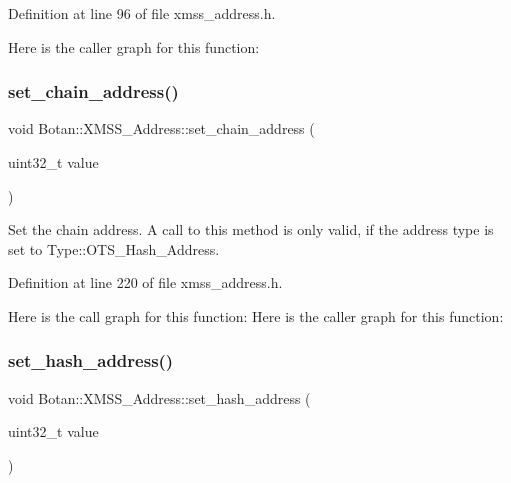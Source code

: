 Definition at line 96 of file xmss\+\_\+address.\+h.

Here is the caller graph for this function\+:
\mbox{\label{class_botan_1_1_x_m_s_s___address_a766e70130914b681020366d80c625fce}} 
\subsubsection{\texorpdfstring{set\+\_\+chain\+\_\+address()}{set\_chain\_address()}}
{\footnotesize\ttfamily void Botan\+::\+X\+M\+S\+S\+\_\+\+Address\+::set\+\_\+chain\+\_\+address (\begin{DoxyParamCaption}\item[{uint32\+\_\+t}]{value }\end{DoxyParamCaption})\hspace{0.3cm}{\ttfamily [inline]}}

Set the chain address. A call to this method is only valid, if the address type is set to Type\+::\+O\+T\+S\+\_\+\+Hash\+\_\+\+Address. 

Definition at line 220 of file xmss\+\_\+address.\+h.

Here is the call graph for this function\+:
Here is the caller graph for this function\+:
\mbox{\label{class_botan_1_1_x_m_s_s___address_a0a5d46d9a17f3a39808356d079b592fa}} 
\subsubsection{\texorpdfstring{set\+\_\+hash\+\_\+address()}{set\_hash\_address()}}
{\footnotesize\ttfamily void Botan\+::\+X\+M\+S\+S\+\_\+\+Address\+::set\+\_\+hash\+\_\+address (\begin{DoxyParamCaption}\item[{uint32\+\_\+t}]{value }\end{DoxyParamCaption})\hspace{0.3cm}{\ttfamily [inline]}}


